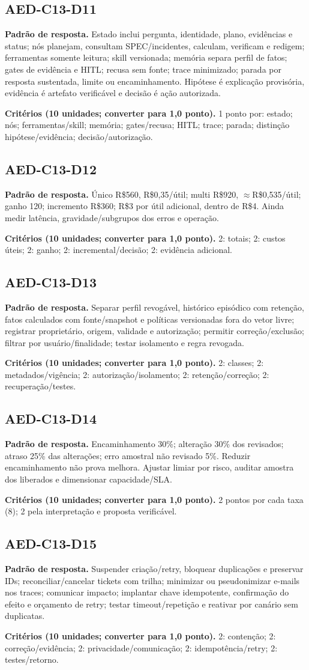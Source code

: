 \documentclass[10pt,a4paper]{article}
\newcommand{\Disc}[3]{\subsection*{#1}\textbf{Padrão de resposta.} #2\par\smallskip\textbf{Critérios (10 unidades; converter para 1,0 ponto).} #3}
\begin{document}
\Disc{AED-C13-D11}{Estado inclui pergunta, identidade, plano, evidências e status; nós planejam, consultam SPEC/incidentes, calculam, verificam e redigem; ferramentas somente leitura; skill versionada; memória separa perfil de fatos; gates de evidência e HITL; recusa sem fonte; trace minimizado; parada por resposta sustentada, limite ou encaminhamento. Hipótese é explicação provisória, evidência é artefato verificável e decisão é ação autorizada.}{1 ponto por: estado; nós; ferramentas/skill; memória; gates/recusa; HITL; trace; parada; distinção hipótese/evidência; decisão/autorização.}
\Disc{AED-C13-D12}{Único R\$560, R\$0,35/útil; multi R\$920, $\approx$R\$0,535/útil; ganho 120; incremento R\$360; R\$3 por útil adicional, dentro de R\$4. Ainda medir latência, gravidade/subgrupos dos erros e operação.}{2: totais; 2: custos úteis; 2: ganho; 2: incremental/decisão; 2: evidência adicional.}
\Disc{AED-C13-D13}{Separar perfil revogável, histórico episódico com retenção, fatos calculados com fonte/snapshot e políticas versionadas fora do vetor livre; registrar proprietário, origem, validade e autorização; permitir correção/exclusão; filtrar por usuário/finalidade; testar isolamento e regra revogada.}{2: classes; 2: metadados/vigência; 2: autorização/isolamento; 2: retenção/correção; 2: recuperação/testes.}
\Disc{AED-C13-D14}{Encaminhamento 30\%; alteração 30\% dos revisados; atraso 25\% das alterações; erro amostral não revisado 5\%. Reduzir encaminhamento não prova melhora. Ajustar limiar por risco, auditar amostra dos liberados e dimensionar capacidade/SLA.}{2 pontos por cada taxa (8); 2 pela interpretação e proposta verificável.}
\Disc{AED-C13-D15}{Suspender criação/retry, bloquear duplicações e preservar IDs; reconciliar/cancelar tickets com trilha; minimizar ou pseudonimizar e-mails nos traces; comunicar impacto; implantar chave idempotente, confirmação do efeito e orçamento de retry; testar timeout/repetição e reativar por canário sem duplicatas.}{2: contenção; 2: correção/evidência; 2: privacidade/comunicação; 2: idempotência/retry; 2: testes/retorno.}
\end{document}
